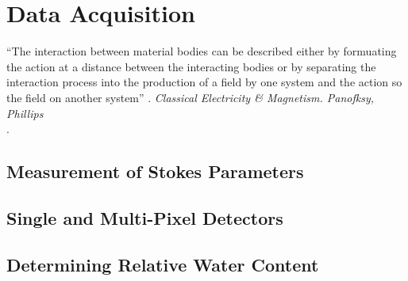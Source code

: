 \chapter{Data Acquisition}
\begin{center}
  \begin{minipage}{0.75\textwidth}
    \begin{small}
      “The interaction between material bodies can be described either by formuating the action at a distance between the interacting bodies or by separating the interaction process into the production of a field by one system and the action so the field on another system” .
      \emph{Classical Electricity \& Magnetism. Panofksy, Phillips}\\.
    \end{small}
  \end{minipage}
  \vspace{0.5cm}
\end{center}

\section{Measurement of Stokes Parameters}

\section{Single and Multi-Pixel Detectors}

\section{Determining Relative Water Content}
